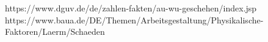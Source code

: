 \begin{dokument}
\begin{numberedlist}
    https://www.dguv.de/de/zahlen-fakten/au-wu-geschehen/index.jsp
    https://www.baua.de/DE/Themen/Arbeitsgestaltung/Physikalische-Faktoren/Laerm/Schaeden
\end{numberedlist}  

\end{dokument}